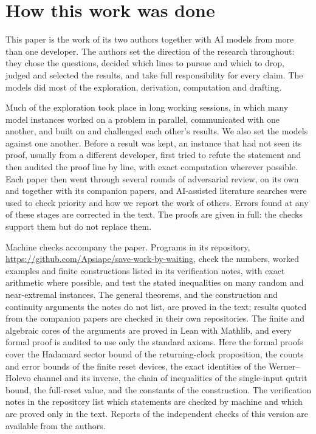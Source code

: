 \documentclass[11pt]{article}
\theoremstyle{definition}
\theoremstyle{remark}
\begin{document}
\section*{How this work was done}
This paper is the work of its two authors together with AI models from more than one developer. The authors set the direction of the research throughout: they chose the questions, decided which lines to pursue and which to drop, judged and selected the results, and take full responsibility for every claim. The models did most of the exploration, derivation, computation and drafting.

Much of the exploration took place in long working sessions, in which many model instances worked on a problem in parallel, communicated with one another, and built on and challenged each other's results. We also set the models against one another. Before a result was kept, an instance that had not seen its proof, usually from a different developer, first tried to refute the statement and then audited the proof line by line, with exact computation wherever possible. Each paper then went through several rounds of adversarial review, on its own and together with its companion papers, and AI-assisted literature searches were used to check priority and how we report the work of others. Errors found at any of these stages are corrected in the text. The proofs are given in full: the checks support them but do not replace them.

Machine checks accompany the paper. Programs in its repository, \url{https://github.com/Apsiape/save-work-by-waiting}, check the numbers, worked examples and finite constructions listed in its verification notes, with exact arithmetic where possible, and test the stated inequalities on many random and near-extremal instances. The general theorems, and the construction and continuity arguments the notes do not list, are proved in the text; results quoted from the companion papers are checked in their own repositories. The finite and algebraic cores of the arguments are proved in Lean with Mathlib, and every formal proof is audited to use only the standard axioms. Here the formal proofs cover the Hadamard sector bound of the returning-clock proposition, the counts and error bounds of the finite reset devices, the exact identities of the Werner--Holevo channel and its inverse, the chain of inequalities of the single-input qutrit bound, the full-reset value, and the constants of the construction. The verification notes in the repository list which statements are checked by machine and which are proved only in the text. Reports of the independent checks of this version are available from the authors.
\end{document}
